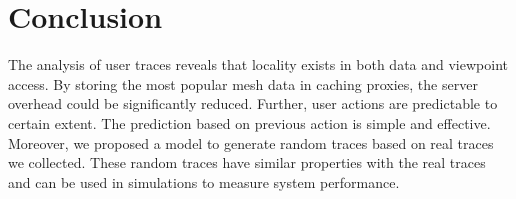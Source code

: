 \section{Conclusion}
The analysis of user traces reveals that 
locality exists in both data and viewpoint access. By
storing the most popular mesh data in caching proxies, 
the server overhead could be significantly reduced. 
Further, user actions are predictable to certain extent. The
prediction based on previous action is simple and effective. 
Moreover, we proposed a model to generate random traces based
on real traces we collected. These random traces have similar
properties with the real traces and can be used in simulations
to measure system performance.

